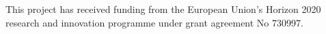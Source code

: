 \documentclass[gmd, manuscript]{copernicus}
\begin{document}


\appendix
\section{}    %

\subsection{}     %


\noappendix       %




\appendixfigures  %

\appendixtables   %







\begin{acknowledgements}

This project has received funding from the European Union's Horizon 2020 research and innovation programme under grant agreement No 730997.

\end{acknowledgements}
\end{document}
